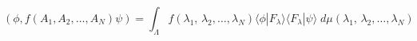 \begin{equation}
 \left(  \phi , f(A_1,A_2,\dots ,A_N ) \psi \right) = 
 	\int_\Lambda f(\lambda_1 ,\, \lambda_2 , \dots ,\lambda_N )  
		\langle \phi |F_\lambda \rangle       
			\langle F_\lambda | \psi \rangle 	\; 
			d\mu (\lambda_1 ,\, \lambda_2 , \dots ,\lambda_N )
\label{eq:rspectres}
\end{equation}


